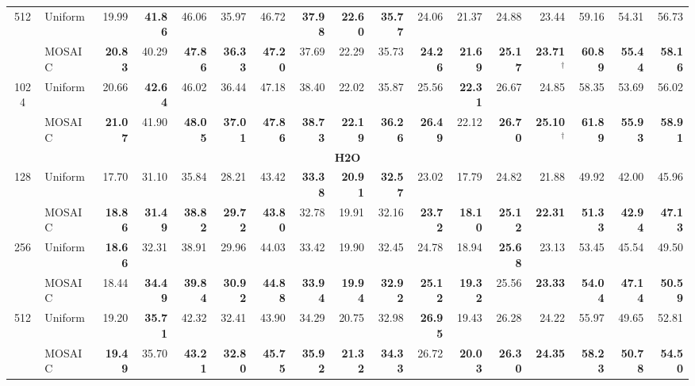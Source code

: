 \begin{table}[tp]
\begin{tabular}{@{} c l rrrr rrrr rrrr rrr @{}}
    \cmidrule(l){1-17}
    \multirow{2}{*}{512} & Uniform & 19.99 & \textbf{41.86} & 46.06 & 35.97 & 46.72 & \textbf{37.98} & \textbf{22.60} & \textbf{35.77} & 24.06 & 21.37 & 24.88 & 23.44 & 59.16 & 54.31 & 56.73 \\
     & MOSAIC & \textbf{20.83} & 40.29 & \textbf{47.86} & \textbf{36.33} & \textbf{47.20} & 37.69 & 22.29 & 35.73 & \textbf{24.26} & \textbf{21.69} & \textbf{25.17} & \textbf{23.71}$^\dagger$ & \textbf{60.89} & \textbf{55.44} & \textbf{58.16} \\
    \cmidrule(l){1-17}
    \multirow{2}{*}{1024} & Uniform & 20.66 & \textbf{42.64} & 46.02 & 36.44 & 47.18 & 38.40 & 22.02 & 35.87 & 25.56 & \textbf{22.31} & 26.67 & 24.85 & 58.35 & 53.69 & 56.02 \\
     & MOSAIC & \textbf{21.07} & 41.90 & \textbf{48.05} & \textbf{37.01} & \textbf{47.86} & \textbf{38.73} & \textbf{22.19} & \textbf{36.26} & \textbf{26.49} & 22.12 & \textbf{26.70} & \textbf{25.10}$^\dagger$ & \textbf{61.89} & \textbf{55.93} & \textbf{58.91} \\
    \midrule
    \multicolumn{17}{c}{\textbf{H2O}} \\
    \midrule
    \multirow{2}{*}{128} & Uniform & 17.70 & 31.10 & 35.84 & 28.21 & 43.42 & \textbf{33.38} & \textbf{20.91} & \textbf{32.57} & 23.02 & 17.79 & 24.82 & 21.88 & 49.92 & 42.00 & 45.96 \\
     & MOSAIC & \textbf{18.86} & \textbf{31.49} & \textbf{38.82} & \textbf{29.72} & \textbf{43.80} & 32.78 & 19.91 & 32.16 & \textbf{23.72} & \textbf{18.10} & \textbf{25.12} & \textbf{22.31} & \textbf{51.33} & \textbf{42.94} & \textbf{47.13} \\
    \cmidrule(l){1-17}
    \multirow{2}{*}{256} & Uniform & \textbf{18.66} & 32.31 & 38.91 & 29.96 & 44.03 & 33.42 & 19.90 & 32.45 & 24.78 & 18.94 & \textbf{25.68} & 23.13 & 53.45 & 45.54 & 49.50 \\
     & MOSAIC & 18.44 & \textbf{34.49} & \textbf{39.84} & \textbf{30.92} & \textbf{44.88} & \textbf{33.94} & \textbf{19.94} & \textbf{32.92} & \textbf{25.12} & \textbf{19.32} & 25.56 & \textbf{23.33} & \textbf{54.04} & \textbf{47.14} & \textbf{50.59} \\
    \cmidrule(l){1-17}
    \multirow{2}{*}{512} & Uniform & 19.20 & \textbf{35.71} & 42.32 & 32.41 & 43.90 & 34.29 & 20.75 & 32.98 & \textbf{26.95} & 19.43 & 26.28 & 24.22 & 55.97 & 49.65 & 52.81 \\
     & MOSAIC & \textbf{19.49} & 35.70 & \textbf{43.21} & \textbf{32.80} & \textbf{45.75} & \textbf{35.92} & \textbf{21.32} & \textbf{34.33} & 26.72 & \textbf{20.03} & \textbf{26.30} & \textbf{24.35} & \textbf{58.23} & \textbf{50.78} & \textbf{54.50} \\

\end{tabular}
\end{table}
